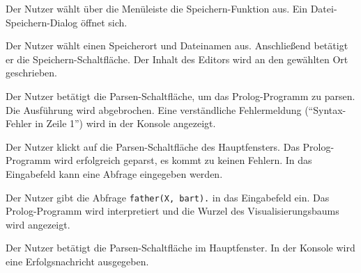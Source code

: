 \documentclass[parskip=full,11pt,twoside]{scrartcl}
\begin{document}


{Der Nutzer wählt über die Menüleiste die Speichern-Funktion aus.}
{Ein Datei-Speichern-Dialog öffnet sich.}

{Der Nutzer wählt einen Speicherort und Dateinamen aus. Anschließend betätigt er die Speichern-Schaltfläche.}
{Der Inhalt des Editors wird an den gewählten Ort geschrieben.}



{Der Nutzer betätigt die Parsen-Schaltfläche, um das Prolog-Programm zu parsen.}
{Die Ausführung wird abgebrochen. Eine verständliche Fehlermeldung (``Syntax-Fehler in Zeile 1'') wird in der Konsole angezeigt.}



{Der Nutzer klickt auf die Parsen-Schaltfläche des Hauptfensters.}
{Das Prolog-Programm wird erfolgreich geparst, es kommt zu keinen Fehlern. In das Eingabefeld kann eine Abfrage eingegeben werden.}

{Der Nutzer gibt die Abfrage \texttt{father(X, bart).} in das Eingabefeld ein.}
{Das Prolog-Programm wird interpretiert und die Wurzel des Visualisierungsbaums wird angezeigt.}



{Der Nutzer betätigt die Parsen-Schaltfläche im Hauptfenster.}
{In der Konsole wird eine Erfolgsnachricht ausgegeben.}
\end{document}
